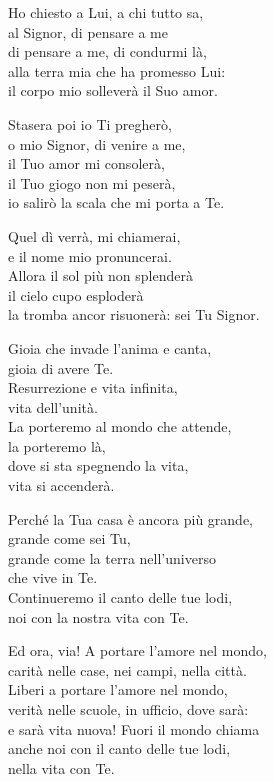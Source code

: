 \documentclass[11pt]{book}
\begin{document}
\settowidth{\versewidth}{alla terra mia che ha promesso Lui:}
\begin{canzone}%
Ho chiesto a Lui, a chi tutto sa,\\
al Signor, di pensare a me\\
di pensare a me, di condurmi là,\\
alla terra mia che ha promesso Lui:\\
il corpo mio solleverà il Suo amor.

Stasera poi io Ti pregherò,\\
o mio Signor, di venire a me,\\
il Tuo amor mi consolerà,\\
il Tuo giogo non mi peserà,\\
io salirò la scala che mi porta a Te.

Quel dì verrà, mi chiamerai,\\
e il nome mio pronuncerai.\\
Allora il sol più non splenderà\\
il cielo cupo esploderà\\
la tromba ancor risuonerà: sei Tu Signor.
\end{canzone}
\pagebreak
\settowidth{\versewidth}{La porteremo al mondo che attende,}
\begin{canzone}%
Gioia che invade l'anima e canta,\\
gioia di avere Te.\\
Resurrezione e vita infinita, \\
vita dell'unità.\\
La porteremo al mondo che attende,\\
la porteremo là,\\
dove si sta spegnendo la vita, \\vita si accenderà.

Perché la Tua casa è ancora più grande,\\
grande come sei Tu,\\
grande come la terra nell'universo \\che vive in Te.\\
Continueremo il canto delle tue lodi,\\
noi con la nostra vita con Te.

Ed ora, via! A portare l'amore nel mondo,\\
carità nelle case, nei campi, nella città.\\
Liberi a portare l'amore nel mondo,\\
verità nelle scuole, in ufficio, dove sarà:\\
e sarà vita nuova! Fuori il mondo chiama\\
anche noi con il canto delle tue lodi,\\
nella vita con Te.
\end{canzone}
\end{document}
